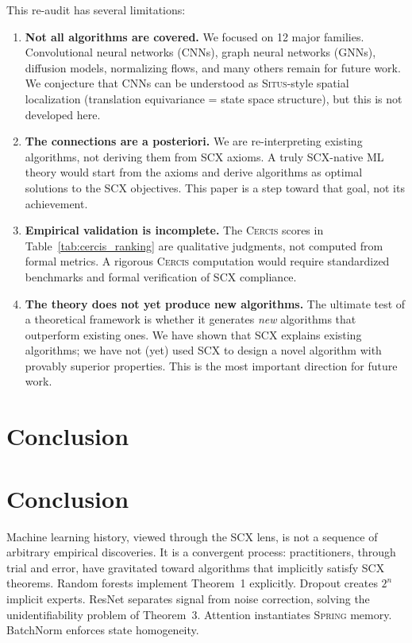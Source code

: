 \documentclass[12pt,a4paper]{article}
\theoremstyle{definition}
\newcommand{\Situs}{\textsc{Situs}}
\newcommand{\Spring}{\textsc{Spring}}
\newcommand{\Cercis}{\textsc{Cercis}}
\newcommand{\SCX}{\textsc{SCX}}
\begin{document}
This re-audit has several limitations:

\begin{enumerate}[label=(\roman*)]
    \item \textbf{Not all algorithms are covered.} We focused on 12 major families. Convolutional neural networks (CNNs), graph neural networks (GNNs), diffusion models, normalizing flows, and many others remain for future work. We conjecture that CNNs can be understood as \Situs{}-style spatial localization (translation equivariance = state space structure), but this is not developed here.
    \item \textbf{The connections are a posteriori.} We are re-interpreting existing algorithms, not deriving them from \SCX{} axioms. A truly \SCX{}-native ML theory would start from the axioms and derive algorithms as optimal solutions to the \SCX{} objectives. This paper is a step toward that goal, not its achievement.
    \item \textbf{Empirical validation is incomplete.} The \Cercis{} scores in Table~\ref{tab:cercis_ranking} are qualitative judgments, not computed from formal metrics. A rigorous \Cercis{} computation would require standardized benchmarks and formal verification of \SCX{} compliance.
    \item \textbf{The theory does not yet produce new algorithms.} The ultimate test of a theoretical framework is whether it generates \emph{new} algorithms that outperform existing ones. We have shown that \SCX{} explains existing algorithms; we have not (yet) used \SCX{} to design a novel algorithm with provably superior properties. This is the most important direction for future work.
\end{enumerate}

\section{Conclusion}
\section{Conclusion}
\label{sec:conclusion}

Machine learning history, viewed through the \SCX{} lens, is not a sequence of arbitrary empirical discoveries. It is a convergent process: practitioners, through trial and error, have gravitated toward algorithms that implicitly satisfy \SCX{} theorems. Random forests implement Theorem~1 explicitly. Dropout creates $2^n$ implicit experts. ResNet separates signal from noise correction, solving the unidentifiability problem of Theorem~3. Attention instantiates \Spring{} memory. BatchNorm enforces state homogeneity.
\end{document}
